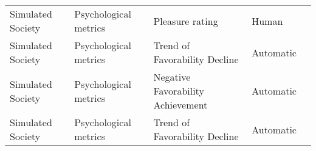 \begin{small}
\begin{center}
\begin{longtable}{@{}p{}p{}p{}p{}p{}@{}}
Simulated Society        & Psychological metrics & Pleasure rating                                                                                                                                                                                             & Human     & \cite{10.1145/3613904.3642545}                                                                                                                                                                                                                                                                                                                                                                          \\
Simulated Society        & Psychological metrics & Trend of Favorability Decline                                                                                                                                                                               & Automatic & \cite{gu2024agentgroupchatinteractivegroupchat}                                                                                                                                                                                                                                                                                                                                                                                        \\
Simulated Society        & Psychological metrics & Negative Favorability Achievement                                                                                                                                                                           & Automatic & \cite{gu2024agentgroupchatinteractivegroupchat}                                                                                                                                                                                                                                                                                                                                                                                        \\
Simulated Society        & Psychological metrics & Trend of Favorability Decline                                                                                                                                                                               & Automatic & \cite{gu2024agentgroupchatinteractivegroupchat}                                                                                                                                                                                                                                                                                                                                                                                        \\

\end{longtable}
\end{center}
\end{small}
